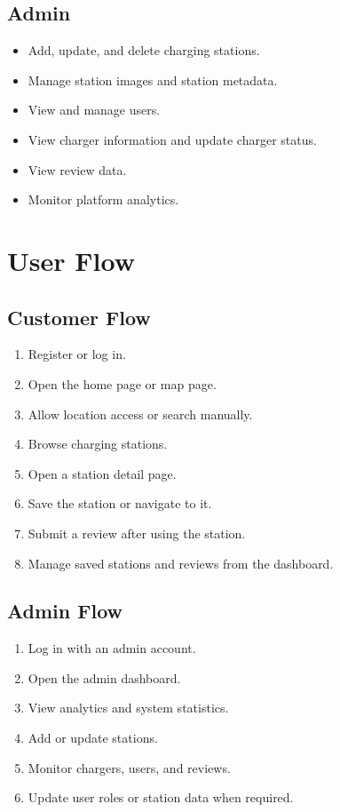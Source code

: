\documentclass[12pt,a4paper]{article}
\begin{document}
\subsection{Admin}

\begin{itemize}
  \item Add, update, and delete charging stations.
  \item Manage station images and station metadata.
  \item View and manage users.
  \item View charger information and update charger status.
  \item View review data.
  \item Monitor platform analytics.
\end{itemize}

\section{User Flow}

\subsection{Customer Flow}

\begin{enumerate}
  \item Register or log in.
  \item Open the home page or map page.
  \item Allow location access or search manually.
  \item Browse charging stations.
  \item Open a station detail page.
  \item Save the station or navigate to it.
  \item Submit a review after using the station.
  \item Manage saved stations and reviews from the dashboard.
\end{enumerate}

\subsection{Admin Flow}

\begin{enumerate}
  \item Log in with an admin account.
  \item Open the admin dashboard.
  \item View analytics and system statistics.
  \item Add or update stations.
  \item Monitor chargers, users, and reviews.
  \item Update user roles or station data when required.
\end{enumerate}
\end{document}
